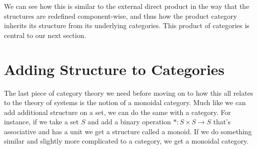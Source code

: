 \documentclass[12pt]{article}
\begin{document}
We can see how this is similar to the external direct product in the way that the structures are redefined component-wise, and thus how the product category inherits its structure from its underlying categories.
This product of categories is central to our next section.


\section*{Adding Structure to Categories}
The last piece of category theory we need before moving on to how this all relates to the theory of systems is the notion of a monoidal category.
Much like we can add additional structure on a set, we can do the same with a category.
For instance, if we take a set $S$ and add a binary operation $*:S \times S \rightarrow S$ that's associative and has a unit we get a structure called a monoid.
If we do something similar and slightly more complicated to a category, we get a monoidal category.
\end{document}
